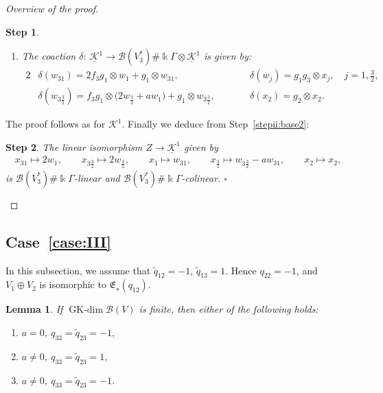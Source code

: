 \documentclass[10pt,a4paper]{amsart}
\providecommand{\qed}{\ensuremath{\square}}
\numberwithin{equation}{section}
\newtheorem{Lemma}[Theorem]{Lemma}
\newtheorem{stepii}{Step}
\newcommand{\GK}{\operatorname{GK-dim}}
\newcommand{\toba}{\mathscr B}
\newcommand{\K}{{\mathcal{K}}}
\newcommand{\Ku}{\underline{\mathcal K}}
\newcommand{\eny}{\mathfrak{E}}
\newcommand{\tresdos}{\frac{3}{2}}
\begin{document}
\begin{proof}[Overview of the proof]
\begin{stepii}
\begin{enumerate}[label=$(\roman*)$]
\item The coaction $\delta\colon\ \Ku^1\to \toba(V_3^*)\#\Bbbk\Gamma\otimes \Ku^1$ is given by:
\begin{alignat*}{2}
&\delta(w_{31}) = 2f_3g_1 \otimes w_{1}+g_1\otimes w_{31},
&&\delta(w_{j})=g_1g_3\otimes x_{j}, \quad j=1,\tfrac{3}{2},
\\
&\delta(w_{3\tresdos}) = f_3g_1 \otimes \big(2w_{\tresdos}+aw_{1}\big)+g_1\otimes w_{3\tresdos}, \qquad
&&\delta(x_2) = g_2\otimes x_2.
\end{alignat*}
\end{enumerate}
\end{stepii}
The proof follows as for $\K^1$. Finally we deduce from Step~\ref{stepii:base2}:

\begin{stepii}\label{stepii:isomorphism}
The linear isomorphism $Z\to\Ku^1$ given by
\begin{align*}
x_{31} \mapsto 2w_1,\qquad
x_{3\tresdos} \mapsto 2w_{\tresdos},\qquad
x_{1} \mapsto w_{31},\qquad
x_{\tresdos} \mapsto w_{3\tresdos}-aw_{31},\qquad
x_{2} \mapsto x_2,
\end{align*}
is $\toba(V_3^*)\#\Bbbk\Gamma$-linear and $\toba(V_3^*)\#\Bbbk\Gamma$-colinear. \hfill \qed
\end{stepii}
\renewcommand{\qed}{}
\end{proof}

\subsection[Case~(III)]{Case~\ref{case:III}}
In this subsection, we assume that $\widetilde{q}_{12}=-1$, $\widetilde{q}_{13}=1$.
Hence $q_{22}=-1$, and $V_1\oplus V_2$ is isomorphic to $\eny_{\star}(q_{12})$.

\begin{Lemma}\label{lemma:caseIII-general}
If $\GK \toba(V)$ is finite, then either of the following holds:{\samepage
\begin{enumerate}[label=$(\Alph*)$]
\item\label{item:caseIII-A} $a = 0$, $q_{33} =\widetilde{q}_{23}= -1,$

\item\label{item:caseIII-B} $a \ne 0$, $q_{33} =\widetilde{q}_{23}= 1,$

\item\label{item:caseIII-C} $a \ne 0$, $q_{33} =\widetilde{q}_{23}= -1$.
\end{enumerate}}
\end{Lemma}
\end{document}
